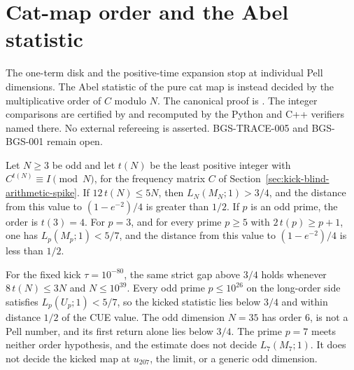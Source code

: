 \section{Cat-map order and the Abel statistic}
\label{sec:order-ladder-abel}
The one-term disk and the positive-time expansion stop at individual Pell
dimensions. The Abel statistic of the pure cat map is instead decided by
the multiplicative order of \(C\) modulo \(N\). The canonical proof is
.
The integer comparisons are certified by
 and recomputed by the
Python and C++ verifiers named there. No external refereeing is asserted.
BGS-TRACE-005 and BGS-BGS-001 remain open.

\begin{theorem}
\label{thm:order-ladder-abel}
Let \(N\ge3\) be odd and let \(t(N)\) be the least positive integer with
\(C^{t(N)}\equiv I\pmod N\), for the frequency matrix \(C\) of
Section~\ref{sec:kick-blind-arithmetic-spike}. If \(12\,t(N)\le5N\), then
\(L_N(M_N;1)>3/4\), and the distance from this value to
\((1-e^{-2})/4\) is greater than \(1/2\). If \(p\) is an odd prime, the
order is \(t(3)=4\). For \(p=3\), and for every prime \(p\ge5\) with
\(2\,t(p)\ge p+1\), one has \(L_p(M_p;1)<5/7\), and the distance from
this value to \((1-e^{-2})/4\) is less than \(1/2\).

For the fixed kick \(\tau=10^{-80}\), the same strict gap above \(3/4\)
holds whenever \(8\,t(N)\le3N\) and \(N\le10^{39}\). Every odd prime
\(p\le10^{26}\) on the long-order side satisfies \(L_p(U_p;1)<5/7\), so
the kicked statistic lies below \(3/4\) and within distance \(1/2\) of the
CUE value. The odd dimension \(N=35\) has order \(6\), is not a Pell
number, and its first return alone lies below \(3/4\). The prime \(p=7\)
meets neither order hypothesis, and the estimate does not decide
\(L_7(M_7;1)\). It does not decide the kicked map at \(u_{207}\), the
limit, or a generic odd dimension.
\end{theorem}
